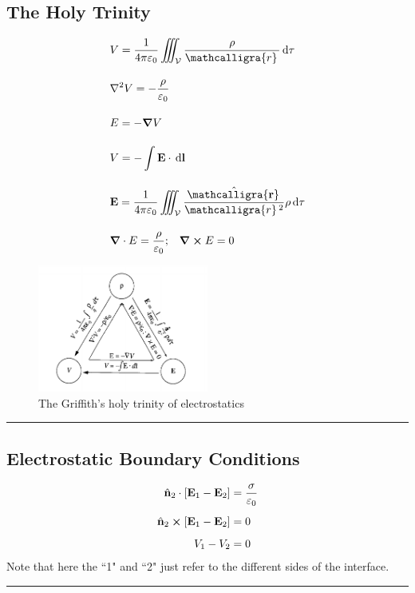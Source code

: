 \documentclass[12pt,english]{article}
\newcommand{\dmr}[1]{\, \mathrm{d}#1} %
\numberwithin{equation}{subsection}
\newcommand{\curly}[1]{\ensuremath{\mathcalligra{#1}\,}}
\let\oldhat\hat
\renewcommand{\vec}[1]{\mathbf{#1}}
\renewcommand{\hat}[1]{\oldhat{\mathbf{#1}}}
\begin{document}
\subsection{The Holy Trinity}
\begin{align}
    &V = \frac{1}{4\pi\varepsilon_0}\iiint_{\mathcal{V}} \frac{\rho}{\curly{r}}\dmr{\tau}\\[1em]
    &\laplacian V = -\frac{\rho}{\varepsilon_0}\\[1em]
    &E = - \grad V\\[1em]
    &V = -\int \vec{E}\cdot \dmr{\vec{l}}\\[1em]
    &\vec{E} = \frac{1}{4\pi\varepsilon_0}\iiint_{\mathcal{V}} \frac{\hat{\curly{r}}}{\curly{r}^2}\rho\dmr{\tau}\\[1em]
    &\grad \cdot E = \frac{\rho}{\varepsilon_0}; \;\;\; \grad \cross E = 0
\end{align}
\begin{figure}[h]
    \centering
    \includegraphics[width =0.5\textwidth]{holytrinity.png}
    \caption{The Griffith's holy trinity of electrostatics\cite{Griffiths:611579}}
\end{figure}

\par\noindent\rule{\textwidth}{0.4pt}
\subsection{Electrostatic Boundary Conditions}
\begin{align}
    \hat{n}_2 \cdot [\vec{E}_1-\vec{E}_2] &= \frac{\sigma}{\varepsilon_0}\\[0.5em]
    \hat{n}_2 \cross [\vec{E}_1-\vec{E}_2] &= 0\\[0.5em]
    V_1 - V_2 &= 0
\end{align}
Note that here the ``1" and ``2" just refer to the different sides of the interface.

\par\noindent\rule{\textwidth}{0.4pt}
\end{document}
